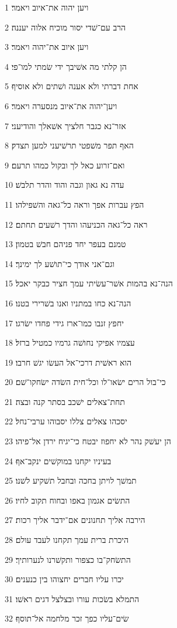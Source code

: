 \par 1 ויען יהוה את־איוב ויאמר׃
\par 2 הרב עם־שׁדי יסור מוכיח אלוה יעננה׃
\par 3 ויען איוב את־יהוה ויאמר׃
\par 4 הן קלתי מה אשׁיבך ידי שׂמתי למו־פי׃
\par 5 אחת דברתי ולא אענה ושׁתים ולא אוסיף׃
\par 6 ויען־יהוה את־איוב מנסערה ויאמר׃
\par 7 אזר־נא כגבר חלציך אשׁאלך והודיעני׃
\par 8 האף תפר משׁפטי תרשׁיעני למען תצדק׃
\par 9 ואם־זרוע כאל לך ובקול כמהו תרעם׃
\par 10 עדה נא גאון וגבה והוד והדר תלבשׁ׃
\par 11 הפץ עברות אפך וראה כל־גאה והשׁפילהו׃
\par 12 ראה כל־גאה הכניעהו והדך רשׁעים תחתם׃
\par 13 טמנם בעפר יחד פניהם חבשׁ בטמון׃
\par 14 וגם־אני אודך כי־תושׁע לך ימינך׃
\par 15 הנה־נא בהמות אשׁר־עשׂיתי עמך חציר כבקר יאכל׃
\par 16 הנה־נא כחו במתניו ואנו בשׁרירי בטנו׃
\par 17 יחפץ זנבו כמו־ארז גידי פחדו ישׂרגו׃
\par 18 עצמיו אפיקי נחושׁה גרמיו כמטיל ברזל׃
\par 19 הוא ראשׁית דרכי־אל העשׂו יגשׁ חרבו׃
\par 20 כי־בול הרים ישׂאו־לו וכל־חית השׂדה ישׂחקו־שׁם׃
\par 21 תחת־צאלים ישׁכב בסתר קנה ובצה׃
\par 22 יסכהו צאלים צללו יסבוהו ערבי־נחל׃
\par 23 הן יעשׁק נהר לא יחפוז יבטח כי־יגיח ירדן אל־פיהו׃
\par 24 בעיניו יקחנו במוקשׁים ינקב־אף׃
\par 25 תמשׁך לויתן בחכה ובחבל תשׁקיע לשׁנו׃
\par 26 התשׂים אגמון באפו ובחוח תקוב לחיו׃
\par 27 הירבה אליך תחנונים אם־ידבר אליך רכות׃
\par 28 היכרת ברית עמך תקחנו לעבד עולם׃
\par 29 התשׂחק־בו כצפור ותקשׁרנו לנערותיך׃
\par 30 יכרו עליו חברים יחצוהו בין כנענים׃
\par 31 התמלא בשׂכות עורו ובצלצל דגים ראשׁו׃
\par 32 שׂים־עליו כפך זכר מלחמה אל־תוסף׃

